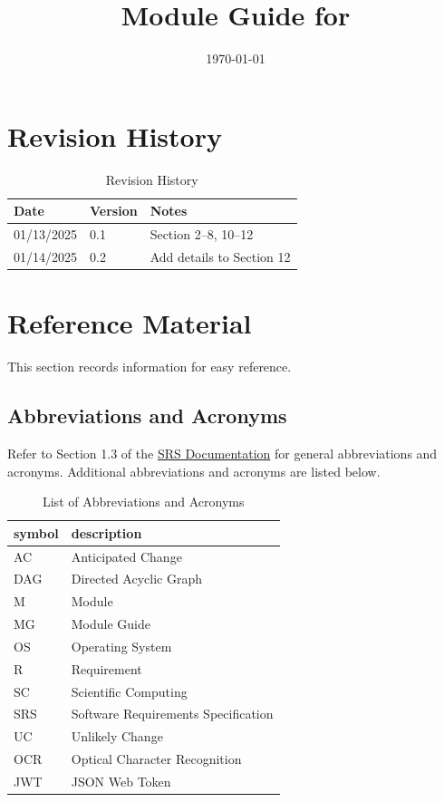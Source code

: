 \documentclass[12pt, titlepage]{article}
\begin{document}
\title{Module Guide for \progname{}} 
\author{\authname}
\date{\today}

\maketitle


\section{Revision History}

\begin{table}[H]
\caption{Revision History}
\centering
\begin{tabularx}{\textwidth}{p{3cm}p{2cm}X}
\toprule {\bf Date} & {\bf Version} & {\bf Notes}\\
\midrule
01/13/2025 & 0.1 & Section 2--8, 10--12\\
01/14/2025 & 0.2 & Add details to Section 12\\
\bottomrule
\end{tabularx}
\end{table}

\newpage

\section{Reference Material}

This section records information for easy reference.

\subsection{Abbreviations and Acronyms}

Refer to Section 1.3 of the
\href{https://github.com/PlutosCapstone/Plutos/blob/main/docs/SRS/SRS.pdf}{SRS
Documentation} for general abbreviations and acronyms. Additional abbreviations
and acronyms are listed below.

\renewcommand{\arraystretch}{1.2}
\begin{table}[H]
\caption{List of Abbreviations and Acronyms}
\centering
\begin{tabularx}{\textwidth}{l X} 
	\toprule		
	\textbf{symbol} & \textbf{description}\\
	\midrule 
	AC & Anticipated Change\\
	DAG & Directed Acyclic Graph \\
	M & Module \\
	MG & Module Guide \\
	OS & Operating System \\
	R & Requirement\\
	SC & Scientific Computing \\
	SRS & Software Requirements Specification\\
	UC & Unlikely Change \\
	OCR & Optical Character Recognition \\
	JWT & JSON Web Token \\
	\bottomrule
\end{tabularx}
\end{table}
\end{document}
